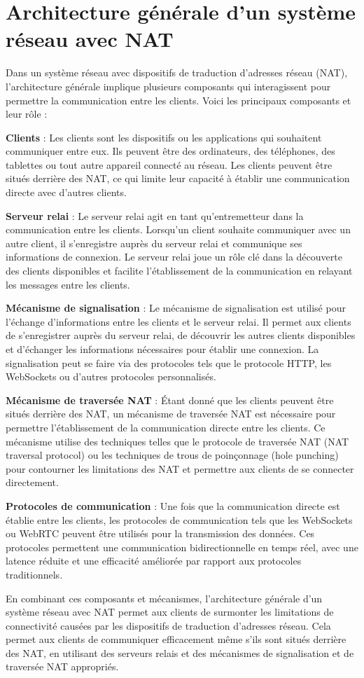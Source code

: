 \section{Architecture générale d'un système réseau avec NAT}

Dans un système réseau avec dispositifs de traduction d'adresses réseau (NAT), l'architecture générale implique plusieurs composants qui interagissent pour permettre la communication entre les clients. 
Voici les principaux composants et leur rôle :

\textbf{Clients} : Les clients sont les dispositifs ou les applications qui souhaitent communiquer entre eux. Ils peuvent être des ordinateurs, des téléphones, des tablettes ou tout autre appareil 
connecté au réseau. Les clients peuvent être situés derrière des NAT, ce qui limite leur capacité à établir une communication directe avec d'autres clients.

\textbf{Serveur relai} : Le serveur relai agit en tant qu'entremetteur dans la communication entre les clients. Lorsqu'un client souhaite communiquer avec un autre client, il s'enregistre auprès 
du serveur relai et communique ses informations de connexion. Le serveur relai joue un rôle clé dans la découverte des clients disponibles et facilite l'établissement de la communication en relayant les messages entre les clients.

\textbf{Mécanisme de signalisation} : Le mécanisme de signalisation est utilisé pour l'échange d'informations entre les clients et le serveur relai. Il permet aux clients de s'enregistrer auprès du 
serveur relai, de découvrir les autres clients disponibles et d'échanger les informations nécessaires pour établir une connexion. La signalisation peut se faire via des protocoles tels que le protocole 
HTTP, les WebSockets ou d'autres protocoles personnalisés.

\textbf{Mécanisme de traversée NAT} : Étant donné que les clients peuvent être situés derrière des NAT, un mécanisme de traversée NAT est nécessaire pour permettre l'établissement de la communication directe entre 
les clients. Ce mécanisme utilise des techniques telles que le protocole de traversée NAT (NAT traversal protocol) ou les techniques de trous de poinçonnage (hole punching) pour contourner les limitations des NAT 
et permettre aux clients de se connecter directement.

\textbf{Protocoles de communication} : Une fois que la communication directe est établie entre les clients, les protocoles de communication tels que les WebSockets ou WebRTC peuvent être utilisés pour la 
transmission des données. Ces protocoles permettent une communication bidirectionnelle en temps réel, avec une latence réduite et une efficacité améliorée par rapport aux protocoles traditionnels.

En combinant ces composants et mécanismes, l'architecture générale d'un système réseau avec NAT permet aux clients de surmonter les limitations de connectivité causées par les dispositifs de 
traduction d'adresses réseau. Cela permet aux clients de communiquer efficacement même s'ils sont situés derrière des NAT, en utilisant des serveurs relais et des mécanismes de signalisation et de traversée NAT appropriés.




